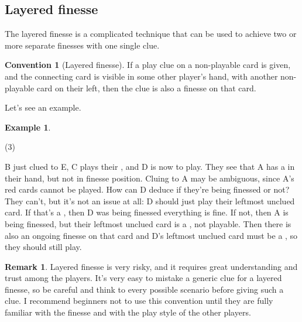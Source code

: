 \documentclass[a4paper]{article}
\theoremstyle{plain}
\theoremstyle{definition}
\newtheorem{remark}[theorem]{Remark}
\newtheorem{example}[theorem]{Example}
\newtheorem{convention}[theorem]{Convention}
\begin{document}
\subsection{Layered finesse}

The layered finesse is a complicated technique that can be used to achieve two or more separate finesses with one single clue.

\begin{convention}[Layered finesse]
	\label{layered-finesse}
	If a play clue on a non-playable card is given, and the connecting card is visible in some other player's hand, with another non-playable card on their left, then the clue is also a finesse on that card.
\end{convention}

Let's see an example.

\begin{example}
	\hfill	
	\begin{tasks}(3)
		\task[+]      
		\task[A]    
		\task[B]    
		\task[C]    
		\task[D]    
		\task[E]    
	\end{tasks}
	
	B just clued  to E, C plays their , and D is now to play. They see that A has a  in their hand, but not in finesse position. Cluing  to A may be ambiguous, since A's red cards cannot be played. How can D deduce if they're being finessed or not? They can't, but it's not an issue at all: D should just play their leftmost unclued card. If that's a , then D was being finessed everything is fine. If not, then A is being finessed, but their leftmost unclued card is a , not playable. Then there is also an ongoing finesse on that card and D's leftmost unclued card must be a , so they should still play.	
\end{example}

\begin{remark}
	Layered finesse is very risky, and it requires great understanding and trust among the players. It's very easy to mistake a generic clue for a layered finesse, so be careful and think to every possible scenario before giving such a clue. I recommend beginners not to use this convention until they are fully familiar with the finesse and with the play style of the other players.
\end{remark}
\end{document}
